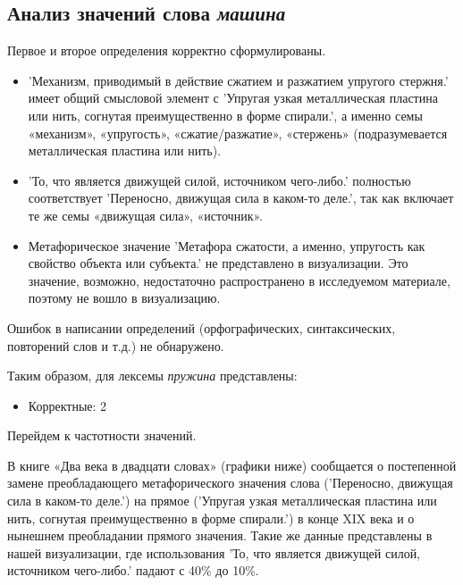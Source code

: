 \subsection*{Анализ значений слова \textit{машина}}

Первое и второе определения корректно сформулированы.

\begin{itemize}
    \item ’Механизм, приводимый в действие сжатием и разжатием упругого стержня.’ имеет общий смысловой элемент с
’Упругая узкая металлическая пластина или нить, согнутая преимущественно в форме спирали.’, а именно семы «механизм», «упругость», «сжатие/разжатие», «стержень» (подразумевается металлическая пластина или нить).

    \item ’То, что является движущей силой, источником чего-либо.’ полностью соответствует
’Переносно, движущая сила в каком-то деле.’, так как включает те же семы «движущая сила», «источник».
\end{itemize}

\begin{itemize}
    \item Метафорическое значение ’Метафора сжатости, а именно, упругость как свойство объекта или субъекта.’ не представлено в визуализации. Это значение, возможно, недостаточно распространено в исследуемом материале, поэтому не вошло в визуализацию.
\end{itemize}

Ошибок в написании определений (орфографических, синтаксических, повторений слов и т.д.) не обнаружено.

Таким образом, для лексемы \textit{пружина} представлены:

\begin{itemize}
    \item Корректные: 2
\end{itemize}

Перейдем к частотности значений.

В книге «Два века в двадцати словах» (графики ниже) сообщается о постепенной замене
преобладающего метафорического значения слова (’Переносно, движущая сила в каком-то деле.’)
на прямое (’Упругая узкая металлическая пластина или нить, согнутая преимущественно в форме спирали.’)
в конце XIX века и о нынешнем преобладании прямого значения.
Такие же данные представлены в нашей визуализации, где использования
’То, что является движущей силой, источником чего-либо.’ падают с 40\% до 10\%.

